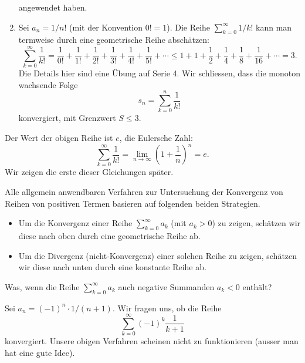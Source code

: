 \documentclass[../main.tex]{subfiles}
\begin{document}
\begin{enumerate}[(1)]
    angewendet haben.
  \item Sei $a_n = 1/n!$ (mit der Konvention $0! = 1$).
    Die Reihe $\sum_{k=0}^{\infty} 1/k!$ kann man
    termweise durch eine geometrische Reihe abschätzen:
    \[
      \sum_{k=0}^{\infty} \frac{1}{k!} = \frac{1}{0!}
      + \frac{1}{1!}
      + \frac{1}{2!}
      + \frac{1}{3!}
      + \frac{1}{4!}
      + \frac{1}{5!}
      + \cdots
      \leq
      1 + 1 + \frac{1}{2} + \frac{1}{4} + \frac{1}{8}
      + \frac{1}{16} + \cdots = 3.
    \]
    Die Details hier sind eine Übung auf Serie 4.
    Wir schliessen, dass die monoton wachsende Folge
    \[
      s_n = \sum_{k=0}^{n} \frac{1}{k!}
    \]
    konvergiert, mit Grenzwert $S \leq 3$.
\end{enumerate}

\begin{remark}
  Der Wert der obigen Reihe ist $e$, die Eulersche Zahl:
  \[
    \sum_{k=0}^{\infty} \frac{1}{k!} = \lim_{n \to \infty}
    {\left( 1+ \frac{1}{n} \right)}^n = e.
  \]
  Wir zeigen die erste dieser Gleichungen später.
\end{remark}

\begin{summary}
  Alle allgemein anwendbaren Verfahren zur Untersuchung
  der Konvergenz von Reihen von positiven
  Termen basieren auf folgenden
  beiden Strategien.
  \begin{itemize}
    \item Um die Konvergenz einer Reihe
      $\sum_{k=0}^{\infty} a_k$ (mit $a_k > 0$) zu zeigen,
      schätzen wir diese nach oben durch
      eine geometrische Reihe ab.
    \item Um die Divergenz (nicht-Konvergenz) einer
      solchen Reihe zu zeigen, schätzen wir diese nach unten
      durch eine konstante Reihe ab.
  \end{itemize}
\end{summary}

\begin{question}
  Was, wenn die Reihe $\sum_{k=0}^{\infty} a_k$ auch
  negative Summanden $a_k < 0$ enthält?
\end{question}

\begin{example}
  Sei $a_n = {(-1)}^n \cdot 1/(n+1)$.
  Wir fragen uns, ob die Reihe
  \[
    \sum_{k=0}^{\infty} {(-1)}^k \frac{1}{k+1}
  \]
  konvergiert. Unsere obigen Verfahren scheinen 
  nicht zu funktionieren (ausser man hat eine
  gute Idee).
\end{example}
\end{document}
